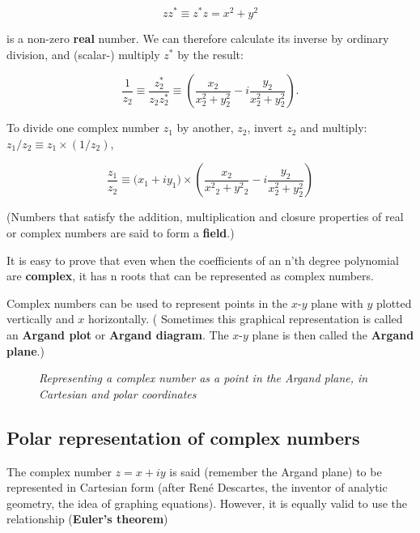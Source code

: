 \begin{equation*}
  zz^* \equiv z^*z = x^2 + y^2
\end{equation*}

is a non-zero \textbf{real} number. We can therefore calculate its inverse by ordinary division, and (scalar-) multiply $z^*$ by the result:

\begin{equation}
  \frac{1}{z_2} \equiv \frac{z_2^*}{z_2z_2^*} \equiv \left(\frac{x_2}{x_2^2 + y_2^2} - i \frac{y_2}{x_2^2 + y_2^2}\right).
\end{equation}

To divide one complex number $z_1$ by another, $z_2$, invert $z_2$ and multiply: $z_1/z_2 \equiv z_1 \times (1/z_2)$, \ie

\begin{equation}
  \frac{z_1}{z_2} \equiv \big(x_1 + iy_1\big) \times \left(\frac{x_2}{x{^2}{_2} + y{^2}{_2}} - i \frac{y_2}{x_2^2 + y_2^2}\right)
\end{equation}

(Numbers that satisfy the addition, multiplication and closure properties of real or complex numbers are said to form a \textbf{field}.)

It is easy to prove that even when the coefficients of an n'th degree polynomial are \textbf{complex}, it has n roots that can be represented as complex numbers.

Complex numbers can be used to represent points in the $x$-$y$ plane with $y$ plotted vertically and $x$ horizontally. ( Sometimes this graphical representation is called an \textbf{Argand plot} or \textbf{Argand diagram}. The $x$-$y$ plane is then called the \textbf{Argand plane}.)

\begin{figure}
    \center
    \caption{\textit{Representing a complex number as a point in the Argand plane, in Cartesian and polar coordinates}}
    \label{fig:07_01}
\end{figure}

\subsection{Polar representation of complex numbers}

The complex number $z = x + iy$ is said (remember the Argand plane) to be represented in Cartesian form (after Ren\'e Descartes, the inventor of analytic geometry, \ie the idea of graphing equations). However, it is equally valid to use the relationship (\textbf{Euler’s theorem})

